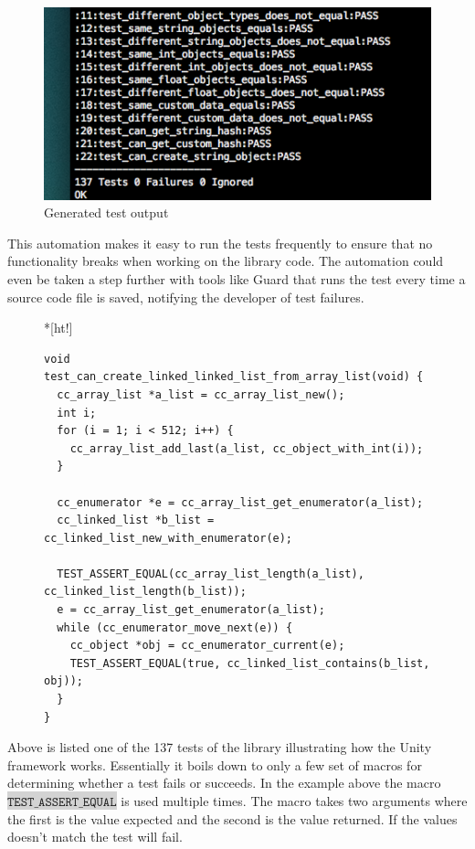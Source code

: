 \documentclass[table]{ituthesis}
\newcommand{\highlight}[1]{\colorbox{lightGray}{$\displaystyle \texttt{#1}$}}
\begin{document}
	\begin{figure}[ht!]
		\begin{center}
			\includegraphics[scale=0.7]{images/test_output.png}
			\caption{Generated test output}
		\end{center}
		\label{fig:generate_test_output}
	\end{figure}
	
	This automation makes it easy to run the tests frequently to ensure that no functionality breaks when working on the library code. The automation could even be taken a step further with tools like Guard that runs the test every time a source code file is saved, notifying the developer of test failures.

\begin{figure}*[ht!]
\begin{lstlisting}[label=test-example,caption=Example of unit test with Unity]
void test_can_create_linked_linked_list_from_array_list(void) {
  cc_array_list *a_list = cc_array_list_new();
  int i;
  for (i = 1; i < 512; i++) {
    cc_array_list_add_last(a_list, cc_object_with_int(i));
  }

  cc_enumerator *e = cc_array_list_get_enumerator(a_list);
  cc_linked_list *b_list = cc_linked_list_new_with_enumerator(e);

  TEST_ASSERT_EQUAL(cc_array_list_length(a_list), cc_linked_list_length(b_list));
  e = cc_array_list_get_enumerator(a_list);
  while (cc_enumerator_move_next(e)) {
    cc_object *obj = cc_enumerator_current(e);
    TEST_ASSERT_EQUAL(true, cc_linked_list_contains(b_list, obj));
  }
}
\end{lstlisting}
\end{figure}
	Above is listed one of the 137 tests of the library illustrating how the Unity framework works. Essentially it boils down to only a few set of macros for determining whether a test fails or succeeds. In the example above the macro \highlight{TEST\_ASSERT\_EQUAL} is used multiple times. The macro takes two arguments where the first is the value expected and the second is the value returned. If the values doesn't match the test will fail.
\end{document}
